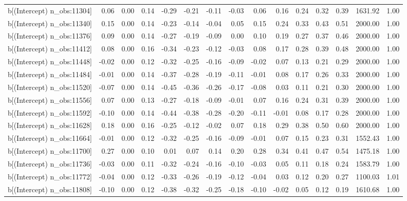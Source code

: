 \begin{table}[ht]
\begin{tabular}{rrrrrrrrrrrrrrr}
  b[(Intercept) n\_obs:11304] & 0.06 & 0.00 & 0.14 & -0.29 & -0.21 & -0.11 & -0.03 & 0.06 & 0.16 & 0.24 & 0.32 & 0.39 & 1631.92 & 1.00 \\ 
  b[(Intercept) n\_obs:11340] & 0.15 & 0.00 & 0.14 & -0.23 & -0.14 & -0.04 & 0.05 & 0.15 & 0.24 & 0.33 & 0.43 & 0.51 & 2000.00 & 1.00 \\ 
  b[(Intercept) n\_obs:11376] & 0.09 & 0.00 & 0.14 & -0.27 & -0.19 & -0.09 & 0.00 & 0.10 & 0.19 & 0.27 & 0.37 & 0.46 & 2000.00 & 1.00 \\ 
  b[(Intercept) n\_obs:11412] & 0.08 & 0.00 & 0.16 & -0.34 & -0.23 & -0.12 & -0.03 & 0.08 & 0.17 & 0.28 & 0.39 & 0.48 & 2000.00 & 1.00 \\ 
  b[(Intercept) n\_obs:11448] & -0.02 & 0.00 & 0.12 & -0.32 & -0.25 & -0.16 & -0.09 & -0.02 & 0.07 & 0.13 & 0.21 & 0.29 & 2000.00 & 1.00 \\ 
  b[(Intercept) n\_obs:11484] & -0.01 & 0.00 & 0.14 & -0.37 & -0.28 & -0.19 & -0.11 & -0.01 & 0.08 & 0.17 & 0.26 & 0.33 & 2000.00 & 1.00 \\ 
  b[(Intercept) n\_obs:11520] & -0.07 & 0.00 & 0.14 & -0.45 & -0.36 & -0.26 & -0.17 & -0.08 & 0.03 & 0.11 & 0.21 & 0.30 & 2000.00 & 1.00 \\ 
  b[(Intercept) n\_obs:11556] & 0.07 & 0.00 & 0.13 & -0.27 & -0.18 & -0.09 & -0.01 & 0.07 & 0.16 & 0.24 & 0.31 & 0.39 & 2000.00 & 1.00 \\ 
  b[(Intercept) n\_obs:11592] & -0.10 & 0.00 & 0.14 & -0.44 & -0.38 & -0.28 & -0.20 & -0.11 & -0.01 & 0.08 & 0.17 & 0.28 & 2000.00 & 1.00 \\ 
  b[(Intercept) n\_obs:11628] & 0.18 & 0.00 & 0.16 & -0.25 & -0.12 & -0.02 & 0.07 & 0.18 & 0.29 & 0.38 & 0.50 & 0.60 & 2000.00 & 1.00 \\ 
  b[(Intercept) n\_obs:11664] & -0.01 & 0.00 & 0.12 & -0.32 & -0.25 & -0.16 & -0.09 & -0.01 & 0.07 & 0.15 & 0.23 & 0.31 & 1552.43 & 1.00 \\ 
  b[(Intercept) n\_obs:11700] & 0.27 & 0.00 & 0.10 & 0.01 & 0.07 & 0.14 & 0.20 & 0.28 & 0.34 & 0.41 & 0.47 & 0.54 & 1475.18 & 1.00 \\ 
  b[(Intercept) n\_obs:11736] & -0.03 & 0.00 & 0.11 & -0.32 & -0.24 & -0.16 & -0.10 & -0.03 & 0.05 & 0.11 & 0.18 & 0.24 & 1583.79 & 1.00 \\ 
  b[(Intercept) n\_obs:11772] & -0.04 & 0.00 & 0.12 & -0.33 & -0.26 & -0.19 & -0.12 & -0.04 & 0.03 & 0.12 & 0.20 & 0.27 & 1100.03 & 1.01 \\ 
  b[(Intercept) n\_obs:11808] & -0.10 & 0.00 & 0.12 & -0.38 & -0.32 & -0.25 & -0.18 & -0.10 & -0.02 & 0.05 & 0.12 & 0.19 & 1610.68 & 1.00 \\ 

\end{tabular}
\end{table}
